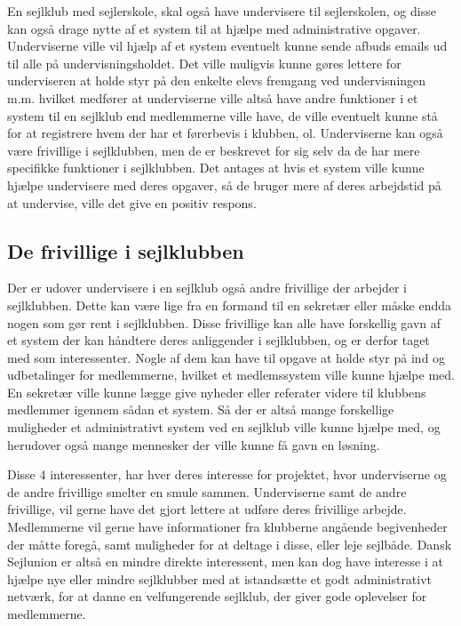 En sejlklub med sejlerskole, skal også have undervisere til sejlerskolen, og disse kan også drage nytte af et system til
at hjælpe med administrative opgaver. Underviserne ville vil hjælp af et system eventuelt kunne sende afbuds emails ud til alle på
undervisningsholdet. Det ville muligvis kunne gøres lettere for underviseren at holde styr på den enkelte elevs fremgang
ved undervisningen m.m. hvilket medfører at underviserne ville altså have andre funktioner i et system til en sejlklub end medlemmerne
ville have, de ville eventuelt kunne stå for at registrere hvem der har et førerbevis i klubben, ol. Underviserne kan også
være frivillige i sejlklubben, men de er beskrevet for sig selv da de har mere specifikke funktioner i sejlklubben. 
Det antages at hvis et system ville kunne hjælpe undervisere med deres opgaver, så de bruger mere af deres arbejdstid på
at undervise, ville det give en positiv respons.

\subsection{De frivillige i sejlklubben}

Der er udover undervisere i en sejlklub også andre frivillige der arbejder i sejlklubben. Dette kan være lige fra en
formand til en sekretær eller måske endda nogen som gør rent i sejlklubben. Disse frivillige kan alle have forskellig
gavn af et system der kan håndtere deres anliggender i sejlklubben, og er derfor taget med som interessenter. Nogle af
dem kan have til opgave at holde styr på ind og udbetalinger for medlemmerne, hvilket et medlemssystem ville kunne
hjælpe med. En sekretær ville kunne lægge give nyheder eller referater videre til klubbens medlemmer igennem sådan et
system. Så der er altså mange forskellige muligheder et administrativt system ved en sejlklub ville kunne hjælpe med, og
herudover også mange mennesker der ville kunne få gavn en løsning.


Disse 4 interessenter, har hver deres interesse for projektet, hvor underviserne og de andre frivillige smelter en smule
sammen. Underviserne samt de andre frivillige, vil gerne have det gjort lettere at udføre deres frivillige arbejde.
Medlemmerne vil gerne have informationer fra klubberne angående begivenheder der
måtte foregå, samt muligheder for at deltage i disse, eller leje sejlbåde.
Dansk Sejlunion er altså en mindre direkte interessent, men kan dog have interesse i at hjælpe nye eller mindre
sejlklubber med at istandsætte et godt administrativt netværk, for at danne en velfungerende sejlklub, 
der giver gode oplevelser for medlemmerne.

